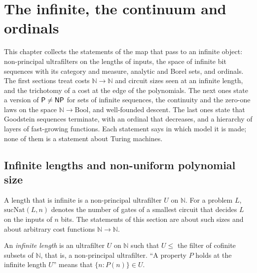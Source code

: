 \chapter{The infinite, the continuum and ordinals}
\label{chap:infinite}

This chapter collects the statements of the map that pass to an infinite object: non-principal ultrafilters on the
lengths of inputs, the space of infinite bit sequences with its category and measure, analytic and Borel sets, and
ordinals. The first sections treat costs $\mathbb{N} \to \mathbb{N}$ and circuit sizes seen at an infinite length, and
the trichotomy of a cost at the edge of the polynomials. The next ones state a version of $\mathsf{P} \ne \mathsf{NP}$ for sets of
infinite sequences, the continuity and the zero-one laws on the space $\mathbb{N} \to \mathrm{Bool}$, and well-founded
descent. The last ones state that Goodstein sequences terminate, with an ordinal that decreases, and a hierarchy of
layers of fast-growing functions. Each statement says in which model it is made; none of them is a statement about
Turing machines.

\section{Infinite lengths and non-uniform polynomial size}
\label{sec:infinite-lengths}

A length that is infinite is a non-principal ultrafilter $U$ on $\mathbb{N}$. For a problem $L$, $\mathrm{sucNat}(L, n)$
denotes the number of gates of a smallest circuit that decides $L$ on the inputs of $n$ bits. The statements of this
section are about such sizes and about arbitrary cost functions $\mathbb{N} \to \mathbb{N}$.

\begin{definition}
  \label{def:infinite-largo-infinito}
  \leanok
  \own{}
  An \emph{infinite length} is an ultrafilter $U$ on $\mathbb{N}$ such that $U \le$ the filter of cofinite subsets
  of $\mathbb{N}$, that is, a non-principal ultrafilter. ``A property $P$ holds at the infinite length $U$'' means
  that $\{n : P(n)\} \in U$.
\end{definition}

